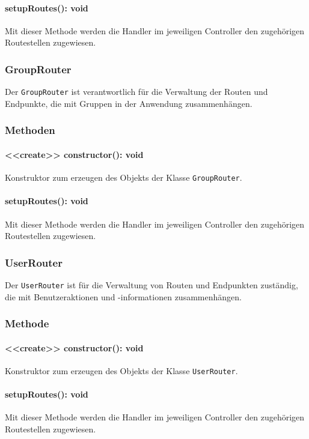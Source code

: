 \documentclass{entwurfsheft}
\begin{document}
\paragraph{setupRoutes(): void}
Mit dieser Methode werden die Handler im jeweiligen Controller den zugehörigen Routestellen zugewiesen.

\subsubsection{GroupRouter}\label{sec:GroupRouter}
Der \texttt{GroupRouter} ist verantwortlich für die Verwaltung der Routen und Endpunkte, die mit Gruppen in der Anwendung zusammenhängen.
\subsubsection*{Methoden}
\paragraph{<<create>> constructor(): void}
Konstruktor zum erzeugen des Objekts der Klasse \newline
\texttt{GroupRouter}.
\paragraph{setupRoutes(): void}
Mit dieser Methode werden die Handler im jeweiligen Controller den zugehörigen Routestellen zugewiesen.

\subsubsection{UserRouter}\label{sec:UserRouter}
Der \texttt{UserRouter} ist für die Verwaltung von Routen und Endpunkten zuständig, die mit Benutzeraktionen und -informationen zusammenhängen.
\subsubsection*{Methode}
\paragraph{<<create>> constructor(): void}
Konstruktor zum erzeugen des Objekts der Klasse \texttt{UserRouter}.
\paragraph{setupRoutes(): void}
Mit dieser Methode werden die Handler im jeweiligen Controller den zugehörigen Routestellen zugewiesen.
\end{document}
